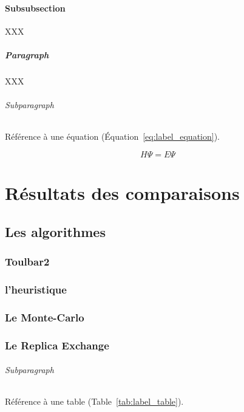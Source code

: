 \documentclass[a4paper,12pt]{book}
\begin{document}
\subsubsection{Subsubsection}

XXX

\paragraph{Paragraph}

XXX

\subparagraph{Subparagraph}

Référence à une équation (Équation~\ref{eq:label_equation}).

\begin{equation}
H \Psi = E \Psi
\label{eq:label_equation}
\end{equation}

\chapter{Résultats des comparaisons}
\label{chap:resultats_comparaisons}

   \section{Les algorithmes} 

   \subsection{Toulbar2} 
   \subsection{l'heuristique} 
   \subsection{Le Monte-Carlo}
   \subsection{Le Replica Exchange}
 

\subparagraph{Subparagraph}

Référence à une table (Table~\ref{tab:label_table}).
\end{document}
